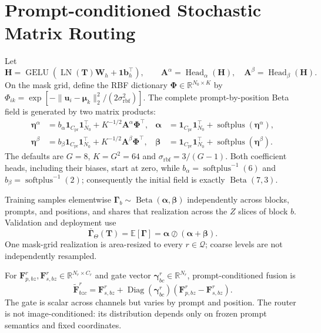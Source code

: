 \documentclass[10pt]{article}
\newcommand{\R}{\mathbb{R}}
\newcommand{\cQ}{\mathcal{Q}}
\newcommand{\ones}{\bm{1}}
\newcommand{\diag}{\operatorname{Diag}}
\newcommand{\LN}{\operatorname{LN}}
\newcommand{\GELU}{\operatorname{GELU}}
\newcommand{\softplus}{\operatorname{softplus}}
\newcommand{\balpha}{\bm{\alpha}}
\newcommand{\bbeta}{\bm{\beta}}
\begin{document}
\section{Prompt-conditioned Stochastic Matrix Routing}
\label{sec:matrix-routing}

Let
\[
 \bm H=\GELU(\LN(\bm T)\bm W_h+\ones\bm b_h^\top),\qquad
 \bm A^\alpha=\operatorname{Head}_\alpha(\bm H),\quad
 \bm A^\beta=\operatorname{Head}_\beta(\bm H).
\]
On the mask grid, define the RBF dictionary
$\bm\Phi\in\R^{N_0\times K}$ by
$\Phi_{ik}=\exp[-\|\bm u_i-\bm\mu_k\|_2^2/(2\sigma_{\mathrm{rbf}}^2)]$.
The complete prompt-by-position Beta field is generated by two matrix products:
\begin{equation}
\boxed{
\begin{aligned}
 \bm\eta^\alpha
 &=b_\alpha\ones_{C_{\mathrm{pr}}}\ones_{N_0}^\top
   +K^{-1/2}\bm A^\alpha\bm\Phi^\top,
 &\balpha&=\ones_{C_{\mathrm{pr}}}\ones_{N_0}^\top
   +\softplus(\bm\eta^\alpha),\\
 \bm\eta^\beta
 &=b_\beta\ones_{C_{\mathrm{pr}}}\ones_{N_0}^\top
   +K^{-1/2}\bm A^\beta\bm\Phi^\top,
 &\bbeta&=\ones_{C_{\mathrm{pr}}}\ones_{N_0}^\top
   +\softplus(\bm\eta^\beta).
\end{aligned}}
\label{eq:beta-matrix}
\end{equation}
The defaults are $G=8$, $K=G^2=64$ and
$\sigma_{\mathrm{rbf}}=3/(G-1)$.  Both coefficient heads, including their
biases, start at zero, while
$b_\alpha=\softplus^{-1}(6)$ and $b_\beta=\softplus^{-1}(2)$; consequently the
initial field is exactly $\operatorname{Beta}(7,3)$.

Training samples elementwise
$\bm\Gamma_b\sim\operatorname{Beta}(\balpha,\bbeta)$ independently across
blocks, prompts, and positions, and shares that realization across the $Z$
slices of block $b$.  Validation and deployment use
\begin{equation}
 \bar{\bm\Gamma}_\Theta(\bm T)
 =\mathbb{E}[\bm\Gamma]
 =\balpha\oslash(\balpha+\bbeta).
 \label{eq:beta-expectation}
\end{equation}
One mask-grid realization is area-resized to every $r\in\cQ$; coarse levels are
not independently resampled.

For
$\bm F_{p,bz}^r,\bm F_{s,bz}^r\in\R^{N_r\times C_r}$ and gate vector
$\bm\gamma_{bc}^r\in\R^{N_r}$, prompt-conditioned fusion is
\begin{equation}
\boxed{
 \widetilde{\bm F}_{bzc}^r
 =\bm F_{s,bz}^r
  +\diag(\bm\gamma_{bc}^r)
   (\bm F_{p,bz}^r-\bm F_{s,bz}^r).}
\label{eq:diagonal-fusion}
\end{equation}
The gate is scalar across channels but varies by prompt and position.  The
router is not image-conditioned: its distribution depends only on frozen prompt
semantics and fixed coordinates.
\end{document}
